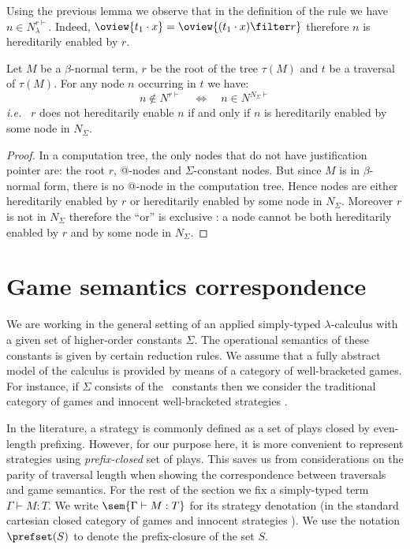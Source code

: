 \begin{remark}
\label{rem:inputvar}
Using the previous lemma we observe that in the definition of the rule  we have
$n \in N_\lambda^{r\vdash}$. Indeed,
$\oview{t_1 \cdot x } = \oview{ (t_1 \cdot x) \filter r}$ therefore $n$
is hereditarily enabled by $r$.
\end{remark}

\begin{lemma}
\label{lem:betaeta_trav}
Let $M$ be a $\beta$-normal term, $r$ be the root of the tree $\tau(M)$ and
$t$ be a traversal of $\tau(M)$.
For any node $n$ occurring in $t$ we have:
$$ n \not\in N^{r\vdash} \quad \iff \quad n \in N^{N_{\Sigma}\vdash}$$
{\it i.e.}~ $r$ does not hereditarily enable $n$ if and only if $n$ is
hereditarily enabled by some node in $N_\Sigma$.
\end{lemma}
\begin{proof}
 In a computation tree, the only nodes that do not have justification pointer are:
the root $r$, @-nodes and $\Sigma$-constant nodes. But since $M$ is
in $\beta$-normal form, there is no @-node in the computation tree.
Hence nodes are either hereditarily enabled by $r$ or hereditarily
enabled by some node in $N_\Sigma$. Moreover $r$ is not in $N_\Sigma$
therefore the ``or'' is exclusive : a node cannot be both hereditarily
enabled by $r$ and by some node in $N_\Sigma$.
\end{proof}



\section{Game semantics correspondence}
\label{sec:gamesemcorresp}

 We are working in the general setting of an applied
simply-typed $\lambda$-calculus with a given set of higher-order
constants $\Sigma$. The operational semantics of these constants is
given by certain reduction rules. We assume that a fully abstract
model of the calculus is provided by means of a category of
well-bracketed games. For instance, if $\Sigma$ consists
of the \pcf\ constants then we consider the traditional
category of games and innocent well-bracketed strategies
\cite{hylandong_pcf,abramsky94full}.


In the literature, a strategy is commonly defined as a set of plays closed by
even-length prefixing. However, for our purpose here, it is more convenient to represent strategies using \emph{prefix-closed} set of plays. This saves us from considerations on the parity of traversal length when
showing the correspondence between traversals and game semantics.
 For the rest of the section we fix a simply-typed term $\Gamma \vdash M :T$. We write $\sem{\Gamma \vdash M : T}$ for its strategy denotation (in the standard cartesian closed category of games and innocent strategies \cite{abramsky94full, hylandong_pcf}). We use the notation $\prefset(S)$ to denote the prefix-closure of the set $S$.

